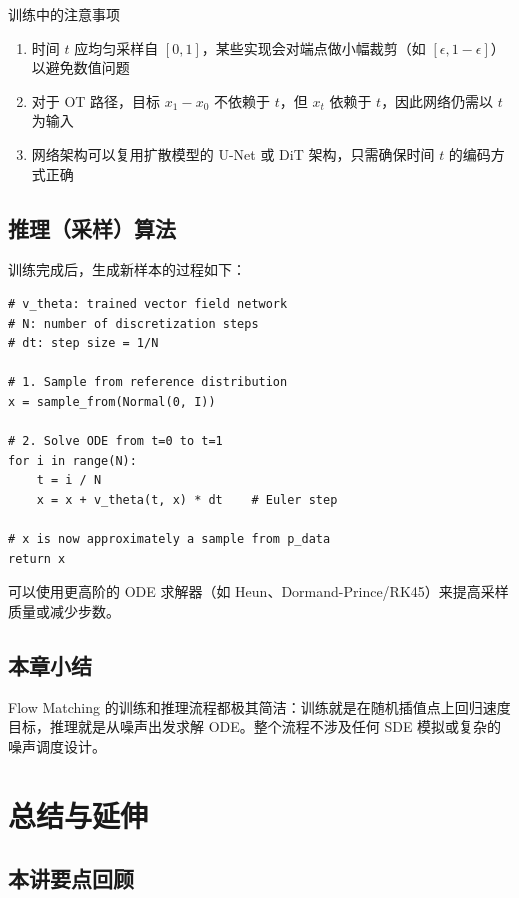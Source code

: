 \documentclass[a4paper]{article}
\begin{document}
\begin{warningbox}{训练中的注意事项}
\begin{enumerate}
    \item 时间 $t$ 应均匀采样自 $[0, 1]$，某些实现会对端点做小幅裁剪（如 $[\epsilon, 1-\epsilon]$）以避免数值问题
    \item 对于 OT 路径，目标 $x_1 - x_0$ 不依赖于 $t$，但 $x_t$ 依赖于 $t$，因此网络仍需以 $t$ 为输入
    \item 网络架构可以复用扩散模型的 U-Net 或 DiT 架构，只需确保时间 $t$ 的编码方式正确
\end{enumerate}
\end{warningbox}

\subsection{推理（采样）算法}

训练完成后，生成新样本的过程如下：

\begin{lstlisting}[caption={Flow Matching 采样算法（Euler 方法）}]
# v_theta: trained vector field network
# N: number of discretization steps
# dt: step size = 1/N

# 1. Sample from reference distribution
x = sample_from(Normal(0, I))

# 2. Solve ODE from t=0 to t=1
for i in range(N):
    t = i / N
    x = x + v_theta(t, x) * dt    # Euler step

# x is now approximately a sample from p_data
return x
\end{lstlisting}

可以使用更高阶的 ODE 求解器（如 Heun、Dormand-Prince/RK45）来提高采样质量或减少步数。

\subsection{本章小结}

Flow Matching 的训练和推理流程都极其简洁：训练就是在随机插值点上回归速度目标，推理就是从噪声出发求解 ODE。整个流程不涉及任何 SDE 模拟或复杂的噪声调度设计。


\section{总结与延伸}

\subsection{本讲要点回顾}
\end{document}
